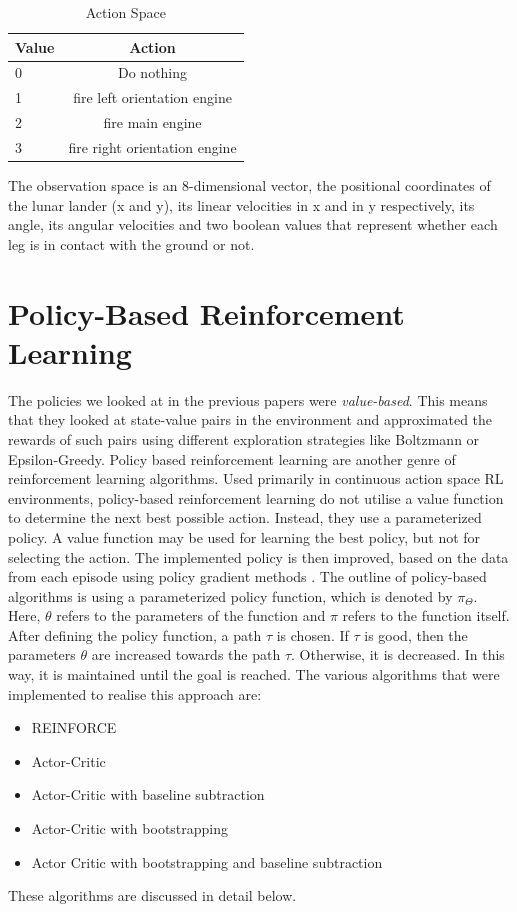 \documentclass{article}
\begin{document}
\begin{table}[htbp]
\centering
\begin{tabular}{|l|c|}
\hline
\textbf{Value} & \textbf{Action} \\
\hline
0  & Do nothing \\
\hline
1 & fire left orientation engine \\
\hline
2  & fire main engine \\
\hline
3 & fire right orientation engine  \\
\hline
\end{tabular}
\caption{Action Space}
\label{tab:hyper-parameters}
\end{table}

The observation space is an 8-dimensional vector, the positional coordinates of the lunar lander (x and y), its linear velocities in x and in y respectively, its angle, its angular velocities and two boolean values that represent whether each leg is in contact with the ground or not. 

\section{Policy-Based Reinforcement Learning}
The policies we looked at in the previous papers were \emph{value-based}. This means that they looked at state-value pairs in the environment and approximated the rewards of such pairs using different exploration strategies like Boltzmann or Epsilon-Greedy. Policy based reinforcement learning are another genre of reinforcement learning algorithms. Used primarily in  continuous action space RL environments, policy-based reinforcement learning do not utilise a value function to determine the next best possible action. Instead, they use a parameterized policy. A value function may be used for learning the best policy, but not for selecting the action. The implemented policy is then improved, based on the data from each episode using policy gradient methods \cite{sutton-barlo}.
The outline of policy-based algorithms is using a parameterized policy function, which is denoted by $\pi_\Theta$. 
Here, $\theta$ refers to the parameters of the function and $\pi$ refers to the function itself. After defining the policy function, a path $\tau$ is chosen. If $\tau$ is good, then the parameters $\theta$ are increased towards the path $\tau$. Otherwise, it is decreased. In this way, it is maintained until the goal is reached.    \cite{plaat-deeprl}
The various algorithms that were implemented to realise this approach are:
\begin{itemize}
\item REINFORCE
\item Actor-Critic
\item Actor-Critic with baseline subtraction
\item Actor-Critic with bootstrapping
\item Actor Critic with bootstrapping and baseline subtraction
\end{itemize}
These algorithms are discussed in detail below. 
\end{document}
